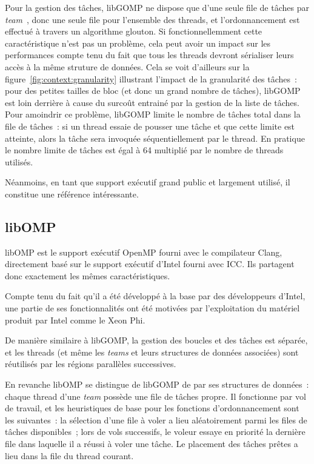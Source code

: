 Pour la gestion des tâches, libGOMP ne dispose que d'une seule file de tâches par \emph{team}~\cite{libGOMP7.3}, donc une seule file pour l'ensemble des threads, et l'ordonnancement est effectué à travers un algorithme glouton.
Si fonctionnellemment cette caractéristique n'est pas un problème, cela peut avoir un impact sur les performances compte tenu du fait que tous les threads devront sérialiser leurs accès à la même struture de données.
Cela se voit d'ailleurs sur la figure~\ref{fig:context:granularity} illustrant l'impact de la granularité des tâches~: pour des petites tailles de bloc (et donc un grand nombre de tâches), libGOMP est loin derrière à cause du surcoût entrainé par la gestion de la liste de tâches.
Pour amoindrir ce problème, libGOMP limite le nombre de tâches total dans la file de tâches~: si un thread essaie de pousser une tâche et que cette limite est atteinte, alors la tâche sera invoquée séquentiellement par le thread.
En pratique le nombre limite de tâches est égal à 64 multiplié par le nombre de threads utilisés.

Néanmoins, en tant que support exécutif grand public et largement utilisé, il constitue une référence intéressante.

\subsection{libOMP}

libOMP est le support exécutif OpenMP fourni avec le compilateur Clang, directement basé sur le support exécutif d'Intel fourni avec ICC.
Ils partagent donc exactement les mêmes caractéristiques.

Compte tenu du fait qu'il a été développé à la base par des développeurs d'Intel, une partie de ses fonctionnalités ont été motivées par l'exploitation du matériel produit par Intel comme le Xeon Phi.

De manière similaire à libGOMP, la gestion des boucles et des tâches est séparée, et les threads (et même les \emph{teams} et leurs structures de données associées) sont réutilisés par les régions parallèles successives.

En revanche libOMP se distingue de libGOMP de par ses structures de données~: chaque thread d'une \emph{team} possède une file de tâches propre.
Il fonctionne par vol de travail, et les heuristiques de base pour les fonctions d'ordonnancement sont les suivantes~:
la sélection d'une file à voler a lieu aléatoirement parmi les files de tâches disponibles~;
lors de vols successifs, le voleur essaye en priorité la dernière file dans laquelle il a réussi à voler une tâche.
Le placement des tâches prêtes a lieu dans la file du thread courant.

